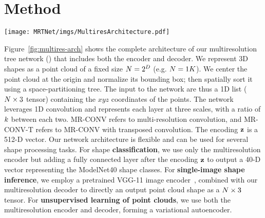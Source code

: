 \section{Method}
\label{mrt:method}
\begin{figure*}
\vspace{-24pt}
\centering
\texttt{[image: MRTNet/imgs/MultiresArchitecture.pdf]}
\vspace{-20pt}
	\caption{\small \label{fig:multires-arch} Our multiresolution tree network (\mrtnet) for processing 3D point clouds. We represent a 3D shape as a 1D list of spatially sorted point cloud. The network represents each layer at three scales (indicated by yellow, red, and blue), the scale ratio is $k$ between each two. The last two convolution layers have kernel size 1 and stride 1. MR-CONV refers to multi-resolution convolution (zoom-in to the inset for details); and MR-CONV-T refers to MR-CONV with transposed convolution. Our network is flexible and can be used for several shape processing tasks.}
\vspace{-16pt}
\end{figure*}
Figure~\ref{fig:multires-arch} shows the complete architecture of our multiresolution tree network (\mrtnet) that includes both the encoder and decoder.
We represent 3D shapes as a point cloud of a fixed size $N=2^D$ (e.g. $N=1K$). We center the point cloud at the origin and normalize its bounding box; then spatially sort it using a space-partitioning tree. The input to the network are thus a 1D list ($N \times 3$ tensor) containing the $xyz$ coordinates of the points. The network leverages 1D convolution and represents each layer at three scales, with a ratio of $k$ between each two. MR-CONV refers to multi-resolution convolution, and MR-CONV-T refers to MR-CONV with transposed convolution. The encoding $\mathbf{z}$ is a 512-D vector. 
Our network architecture is flexible and can be used for several shape processing tasks. For shape \textbf{classification}, 
we use only the multiresolution encoder but adding a fully connected layer after the encoding $\mathbf{z}$ to output a 40-D vector representing the ModelNet40 shape classes. 
For \textbf{single-image shape inference}, we employ a pretrained VGG-11 image encoder~\cite{vgg}, 
combined with our multiresolution decoder to directly an output point cloud shape as a $N \times 3$ tensor. 
For \textbf{unsupervised learning of point clouds}, we use both the multiresolution encoder and decoder, forming a variational autoencoder. 


